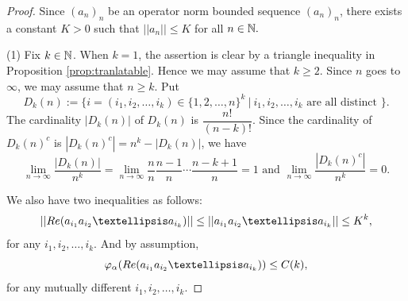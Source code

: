 \documentclass[10pt,a4paper]{amsart}
\begin{document}
\begin{proof}
Since  $(a_n)_n$ be an operator norm bounded sequence $(a_n)_n$, there exists a constant $K > 0$ such that 
$||a_n||\leq K$ for all $n \in {\Bbb N}.$ 

(1)  Fix $k \in {\Bbb N}$. When $k = 1$, the assertion is clear by a triangle inequality in Proposition \ref{prop:tranlatable}. Hence we may assume that $k \geq 2.$ 
Since $n$ goes to $\infty$, we may assume that $n \geq k$.
Put 
$$
D_k(n) := \{i = (i_1,i_2,\dots,i_k) \in \{1,2,\dots,n\}^k \ | \  i_1,i_2,\dots,i_k \text{  are all distinct } \} .
$$
The cardinality $|D_k(n)|$ of $D_k(n)$ is $\dfrac{n!}{(n-k)!}$. 
Since the cardinality of $D_k(n)^c$ is $|D_k(n)^c|=n^k-|D_k(n)|$, we have
\[  \lim_{n\to\infty} \frac{|D_k(n)|}{n^k} = \lim_{n\to\infty}\frac{n}{n}\frac{n-1}{n}\cdots\frac{n-k+1}{n} = 1  
\text{ and } \lim_{n\to\infty} \frac{|D_k(n)^c|}{n^k}= 0.  \]

We also have two inequalities as follows:
$$
|| {\rm Re}(a_{i_1}a_{i_2} \dots a_{i_k}) || \leq ||  a_{i_1}a_{i_2} \dots a_{i_k}    || \leq K^k, 
$$
for any $i_1, i_2, \dots, i_k$.  And by assumption, 
$$
\varphi_{\alpha}({\rm Re} (a_{i_1}a_{i_2} \dots a_{i_k})) \leq C(k), 
$$
for any mutually different $i_1, i_2, \dots, i_k$. 


\end{proof}
\end{document}
